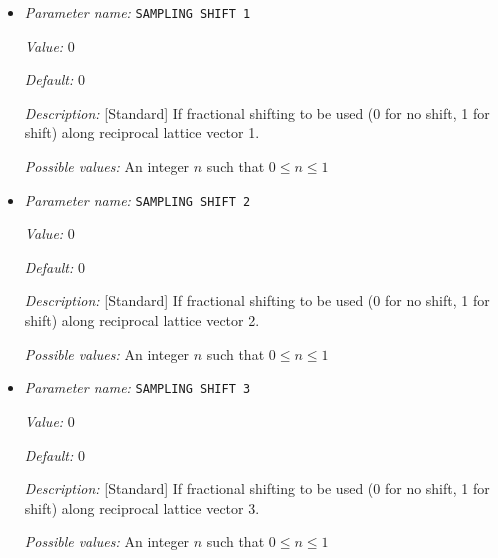 \begin{itemize}
{\it Value:} 1


{\it Default:} 1


{\it Description:} [Standard] Number of Monkhorst-Pack grid points to be used along reciprocal lattice vector 3.


{\it Possible values:} An integer $n$ such that $1\leq n \leq 1000$
\item {\it Parameter name:} {\tt SAMPLING SHIFT 1}
\label{parameters:Brillouin zone k point sampling options/Monkhorst_2dPack _28MP_29 grid generation/SAMPLING SHIFT 1}
\label{parameters:Brillouin_20zone_20k_20point_20sampling_20options/Monkhorst_2dPack_20_28MP_29_20grid_20generation/SAMPLING_20SHIFT_201}


{\it Value:} 0


{\it Default:} 0


{\it Description:} [Standard] If fractional shifting to be used (0 for no shift, 1 for shift) along reciprocal lattice vector 1.


{\it Possible values:} An integer $n$ such that $0\leq n \leq 1$
\item {\it Parameter name:} {\tt SAMPLING SHIFT 2}
\label{parameters:Brillouin zone k point sampling options/Monkhorst_2dPack _28MP_29 grid generation/SAMPLING SHIFT 2}
\label{parameters:Brillouin_20zone_20k_20point_20sampling_20options/Monkhorst_2dPack_20_28MP_29_20grid_20generation/SAMPLING_20SHIFT_202}


{\it Value:} 0


{\it Default:} 0


{\it Description:} [Standard] If fractional shifting to be used (0 for no shift, 1 for shift) along reciprocal lattice vector 2.


{\it Possible values:} An integer $n$ such that $0\leq n \leq 1$
\item {\it Parameter name:} {\tt SAMPLING SHIFT 3}
\label{parameters:Brillouin zone k point sampling options/Monkhorst_2dPack _28MP_29 grid generation/SAMPLING SHIFT 3}
\label{parameters:Brillouin_20zone_20k_20point_20sampling_20options/Monkhorst_2dPack_20_28MP_29_20grid_20generation/SAMPLING_20SHIFT_203}


{\it Value:} 0


{\it Default:} 0


{\it Description:} [Standard] If fractional shifting to be used (0 for no shift, 1 for shift) along reciprocal lattice vector 3.


{\it Possible values:} An integer $n$ such that $0\leq n \leq 1$
\end{itemize}

